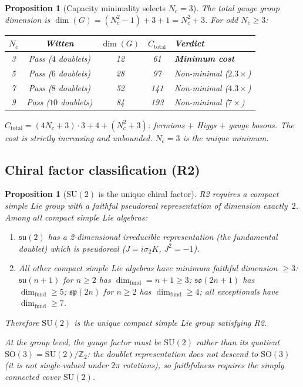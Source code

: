 \documentclass[11pt,a4paper]{article}
\newtheorem{proposition}[theorem]{Proposition}
\theoremstyle{definition}
\newcommand{\SU}{\mathrm{SU}}
\begin{document}
\begin{proposition}[Capacity minimality selects $N_c = 3$]\label{prop:Nc3}
The total gauge group dimension is
$\dim(G) = (N_c^2 - 1) + 3 + 1 = N_c^2 + 3$.  For odd $N_c \ge 3$:

\smallskip
\begin{center}
\small
\begin{tabular}{@{}ccccl@{}}
\toprule
$N_c$ & Witten & $\dim(G)$ & $C_{\mathrm{total}}$ & Verdict \\
\midrule
3 & Pass ($4$ doublets) & 12 & 61 & \textbf{Minimum cost} \\
5 & Pass ($6$ doublets) & 28 & 97 & Non-minimal ($2.3\times$) \\
7 & Pass ($8$ doublets) & 52 & 141 & Non-minimal ($4.3\times$) \\
9 & Pass ($10$ doublets) & 84 & 193 & Non-minimal ($7\times$) \\
\bottomrule
\end{tabular}
\end{center}

\smallskip\noindent $C_{\mathrm{total}} = (4N_c + 3) \cdot 3 + 4 + (N_c^2 + 3)$:
fermions $+$ Higgs $+$ gauge bosons.  The cost is strictly increasing
and unbounded.  $N_c = 3$ is the unique minimum.
\end{proposition}


\subsection{Chiral factor classification (R2)}
\label{sec:R2_classification}

\begin{proposition}[$\SU(2)$ is the unique chiral factor]\label{prop:R2_unique}
R2 requires a compact simple Lie group with a faithful pseudoreal
representation of dimension exactly~$2$.  Among all compact simple Lie
algebras:
\begin{enumerate}[label=(\roman*),nosep]
  \item $\mathfrak{su}(2)$ has a 2-dimensional irreducible representation
        (the fundamental doublet) which is pseudoreal
        ($J = i\sigma_2 K$, $J^2 = -1$).
  \item All other compact simple Lie algebras have minimum faithful
        dimension $\ge 3$: $\mathfrak{su}(n+1)$ for $n \ge 2$ has
        $\dim_{\mathrm{fund}} = n + 1 \ge 3$; $\mathfrak{so}(2n+1)$
        has $\dim_{\mathrm{fund}} \ge 5$; $\mathfrak{sp}(2n)$ for $n \ge 2$
        has $\dim_{\mathrm{fund}} \ge 4$; all exceptionals have
        $\dim_{\mathrm{fund}} \ge 7$.
\end{enumerate}
Therefore $\SU(2)$ is the unique compact simple Lie group satisfying R2.

At the group level, the gauge factor must be $\SU(2)$ rather than its
quotient $\mathrm{SO}(3) = \SU(2)/\mathbb{Z}_2$: the doublet
representation does not descend to $\mathrm{SO}(3)$ (it is not
single-valued under $2\pi$ rotations), so faithfulness requires
the simply connected cover $\SU(2)$.
\end{proposition}
\end{document}
